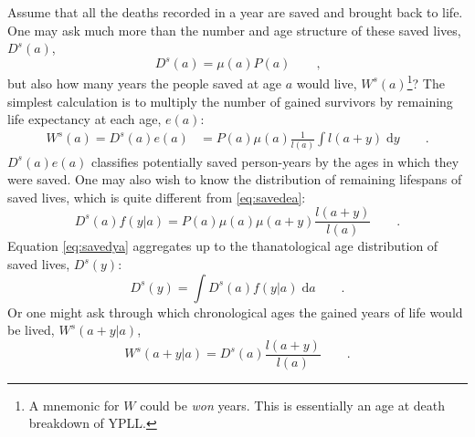 \documentclass{article}
\newcommand{\dd}{\; \mathrm{d}}
\newcommand{\tc}{\quad\quad\text{,}}
\newcommand{\tp}{\quad\quad\text{.}}
\begin{document}
\begin{appendices}
Assume that all the deaths recorded in a year are saved and brought back to
life. One may ask much more than the number and age structure of these saved
lives, $D^s(a)$,
\begin{equation}
\label{eq:Dsa}
D^s(a) = \mu(a)P(a) \tc
\end{equation}
but also how many years the people saved at age $a$ would live, 
$W^s(a)$\footnote{A mnemonic for $W$ could be \textit{won} years. This is
essentially an age at death breakdown of YPLL.}? The simplest calculation is
to multiply the number of gained survivors by remaining life expectancy at each
age, $e(a)$:
\begin{align}
\label{eq:savedea}
W^s(a) = D^s(a)e(a) &= P(a)\mu(a)\frac{1}{l(a)}\int l(a+y) \dd y \tp
\end{align}
$D^s(a)e(a)$ classifies potentially saved person-years by the
ages in which they were saved. One may also wish to know the distribution of remaining lifespans of saved
lives, which is quite different from \eqref{eq:savedea}:
\begin{equation}
\label{eq:savedya}
D^s(a)f(y|a) = P(a)\mu(a)\mu(a+y) \frac{l(a+y)}{l(a)} \tp
\end{equation}
Equation \eqref{eq:savedya} aggregates up to the thanatological age distribution
of saved lives, $D^s(y)$:
\begin{equation}
\label{eq:savedy}
D^s(y) = \int D^s(a)f(y|a) \dd a \tp
\end{equation}
Or one might ask through which chronological ages the gained years of life
would be lived, $W^s(a+y|a)$,
\begin{equation}
\label{eq:gaineday}
W^s(a+y|a) = D^s(a)\frac{l(a+y)}{l(a)} \tp
\end{equation}


\end{appendices}
\end{document}
